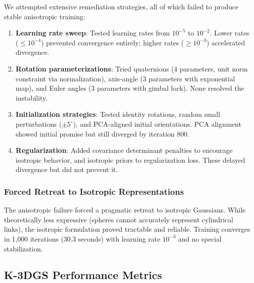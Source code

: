 \documentclass[12pt,a4paper,oneside]{report}
\begin{document}
We attempted extensive remediation strategies, all of which failed to produce stable anisotropic training:
\begin{enumerate}
    \item \textbf{Learning rate sweep}: Tested learning rates from $10^{-5}$ to $10^{-2}$. Lower rates ($\leq 10^{-4}$) prevented convergence entirely; higher rates ($\geq 10^{-3}$) accelerated divergence.
    \item \textbf{Rotation parameterizations}: Tried quaternions (4 parameters, unit norm constraint via normalization), axis-angle (3 parameters with exponential map), and Euler angles (3 parameters with gimbal lock). None resolved the instability.
    \item \textbf{Initialization strategies}: Tested identity rotations, random small perturbations ($\pm5^\circ$), and PCA-aligned initial orientations. PCA alignment showed initial promise but still diverged by iteration 800.
    \item \textbf{Regularization}: Added covariance determinant penalties to encourage isotropic behavior, and isotropic priors to regularization loss. These delayed divergence but did not prevent it.
\end{enumerate}
\subsubsection{Forced Retreat to Isotropic Representations}
\label{subsubsec:forced_retreat_to_isotropic_representations}

The anisotropic failure forced a pragmatic retreat to isotropic Gaussians. While theoretically less expressive (spheres cannot accurately represent cylindrical links), the isotropic formulation proved tractable and reliable. Training converges in 1,000 iterations (30.3 seconds) with learning rate $10^{-3}$ and no special stabilization.
\subsection{K-3DGS Performance Metrics}
\label{subsec:k_3dgs_performance_metrics}
\end{document}

